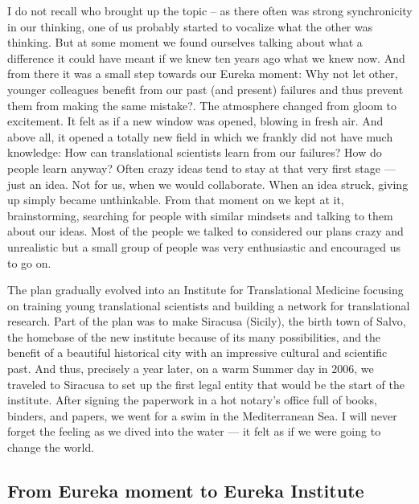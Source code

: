 \documentclass[authordate, editorial]{jote-new-article}
\begin{document}
	I do not recall who brought up the topic -- as there often was strong synchronicity in our thinking, one of us probably started to vocalize what the other was thinking. But at some moment we found ourselves talking about what a difference it could have meant if we knew ten years ago what we knew now. And from there it was a small step towards our Eureka moment: Why not let other, younger colleagues benefit from our past (and present) failures and thus prevent them from making the same mistake?. The atmosphere changed from gloom to excitement. It felt as if a new window was opened, blowing in fresh air. And above all, it opened a totally new field in which we frankly did not have much knowledge: How can translational scientists learn from our failures? How do people learn anyway? Often crazy ideas tend to stay at that very first stage — just an idea. Not for us, when we would collaborate. When an idea struck, giving up simply became unthinkable. From that moment on we kept at it, brainstorming, searching for people with similar mindsets and talking to them about our ideas. Most of the people we talked to considered our plans crazy and unrealistic but a small group of people was very enthusiastic and encouraged us to go on.



	The plan gradually evolved into an Institute for Translational Medicine focusing on training young translational scientists and building a network for translational research. Part of the plan was to make Siracusa (Sicily), the birth town of Salvo, the homebase of the new institute because of its many possibilities, and the benefit of a beautiful historical city with an impressive cultural and scientific past. And thus, precisely a year later, on a warm Summer day in 2006, we traveled to Siracusa to set up the first legal entity that would be the start of the institute. After signing the paperwork in a hot notary's office full of books, binders, and papers, we went for a swim in the Mediterranean Sea. I will never forget the feeling as we dived into the water — it felt as if we were going to change the world.







	\subsection{From Eureka moment to Eureka Institute}
\end{document}
